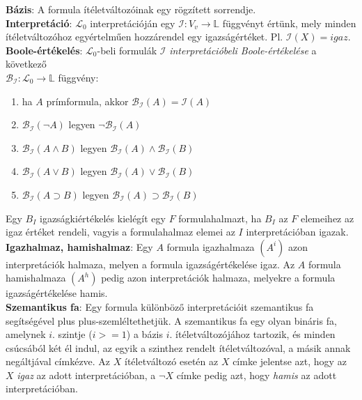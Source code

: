 \documentclass[tikz,12pt,margin=0px]{article}
\newcommand\lword[1]{\leavevmode\nobreak\hskip0pt plus\linewidth\penalty50\hskip0pt plus-\linewidth\nobreak #1}
\begin{document}
	\noindent \textbf{Bázis}: A formula ítéletváltozóinak egy rögzített sorrendje.\\

    \noindent \textbf{Interpretáció}: $\mathcal{L}_{0}$ interpretációján egy $\mathcal{I} : V_{v} \to \mathbb{L}$ függvényt értünk, mely minden ítéletváltozóhoz egyértelműen hozzárendel egy igazságértéket. Pl. $\mathcal{I}(X) = igaz$.\\

    \noindent \textbf{Boole-értékelés}: $\mathcal{L}_{0}$-beli formulák $\mathcal{I}$ \textit{interpretációbeli Boole-értékelése} a következő\\
    $\mathcal{B}_{\mathcal{I}} : \mathcal{L}_{0} \to \mathbb{L}$ függvény:
	
	\begin{enumerate}
		\item ha $A$ prímformula, akkor $\mathcal{B}_{\mathcal{I}}(A) = \mathcal{I}(A)$
		
		\item $\mathcal{B}_{\mathcal{I}}(\neg A)$ legyen $\neg \mathcal{B}_{\mathcal{I}}(A) $
		
		\item $\mathcal{B}_{\mathcal{I}}(A \wedge B)$ legyen $\mathcal{B}_{\mathcal{I}}(A) \wedge \mathcal{B}_{\mathcal{I}}(B)$
		
		\item $\mathcal{B}_{\mathcal{I}}(A \vee B)$ legyen $\mathcal{B}_{\mathcal{I}}(A) \vee \mathcal{B}_{\mathcal{I}}(B)$
		
		\item $\mathcal{B}_{\mathcal{I}}(A \supset B)$ legyen $\mathcal{B}_{\mathcal{I}}(A) \supset \mathcal{B}_{\mathcal{I}}(B)$
	\end{enumerate}

    \noindent Egy $B_I$ igazságkiértékelés kielégít egy $F$ formulahalmazt, ha $B_I$ az $F$ elemeihez az igaz értéket rendeli, vagyis a formulahalmaz elemei az $I$ interpretációban igazak.\\

    \noindent \textbf{Igazhalmaz, hamishalmaz}: Egy $A$ formula igazhalmaza $(A^{i})$ azon interpretációk halmaza, melyen a formula igazságértékelése igaz. Az $A$ formula hamishalmaza $(A^{h})$ pedig azon interpretációk halmaza, melyekre a formula igazságértékelése hamis.\\
	
    \noindent \textbf{Szemantikus fa}: Egy formula különböző interpretációit szemantikus fa segítségével \lword{szemléltethetjük}. A szemantikus fa egy olyan bináris fa, amelynek $i$. szintje ($i>=1$) a bázis $i$. ítéletváltozójához tartozik, és minden csúcsából két él indul, az egyik a szinthez rendelt ítéletváltozóval, a másik annak negáltjával címkézve. Az $X$ ítéletváltozó esetén az $X$ címke jelentse azt, hogy az $X$ \textit{igaz} az adott interpretációban, a $\neg X$ címke pedig azt, hogy \textit{hamis} az adott interpretációban.\\
\end{document}
